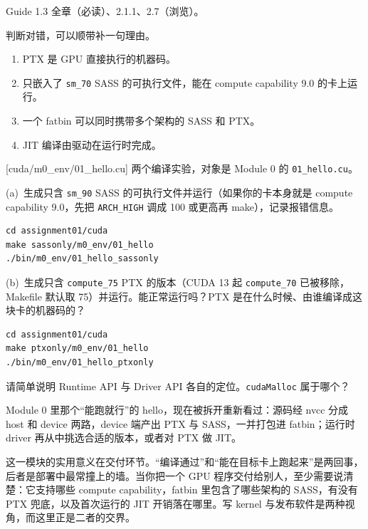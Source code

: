 \documentclass[11pt,a4paper,fontset=none]{ctexart}
\begin{document}
\begin{reading}
Guide 1.3 全章（必读）、2.1.1、2.7（浏览）。
\end{reading}

判断对错，可以顺带补一句理由。
\begin{enumerate}[label=(\alph*)]
  \item PTX 是 GPU 直接执行的机器码。
  \item 只嵌入了 \texttt{sm\_70} SASS 的可执行文件，能在 compute capability 9.0 的卡上运行。
  \item 一个 fatbin 可以同时携带多个架构的 SASS 和 PTX。
  \item JIT 编译由驱动在运行时完成。
\end{enumerate}

[cuda/m0\_env/01\_hello.cu]
两个编译实验，对象是 Module 0 的 \texttt{01\_hello.cu}。

(a)~生成只含 \texttt{sm\_90} SASS 的可执行文件并运行（如果你的卡本身就是 compute capability 9.0，先把 \texttt{ARCH\_HIGH} 调成 100 或更高再 make），记录报错信息。

\begin{lstlisting}
cd assignment01/cuda
make sassonly/m0_env/01_hello
./bin/m0_env/01_hello_sassonly
\end{lstlisting}

(b)~生成只含 \texttt{compute\_75} PTX 的版本（CUDA 13 起 \texttt{compute\_70} 已被移除，Makefile 默认取 75）并运行。能正常运行吗？PTX 是在什么时候、由谁编译成这块卡的机器码的？

\begin{lstlisting}
cd assignment01/cuda
make ptxonly/m0_env/01_hello
./bin/m0_env/01_hello_ptxonly
\end{lstlisting}

请简单说明 Runtime API 与 Driver API 各自的定位。\texttt{cudaMalloc} 属于哪个？

\begin{lookback}
Module 0 里那个“能跑就行”的 hello，现在被拆开重新看过：源码经 nvcc 分成 host 和 device 两路，device 端产出 PTX 与 SASS，一并打包进 fatbin；运行时 driver 再从中挑选合适的版本，或者对 PTX 做 JIT。

这一模块的实用意义在交付环节。“编译通过”和“能在目标卡上跑起来”是两回事，后者是部署中最常撞上的墙。当你把一个 GPU 程序交付给别人，至少需要说清楚：它支持哪些 compute capability，fatbin 里包含了哪些架构的 SASS，有没有 PTX 兜底，以及首次运行的 JIT 开销落在哪里。写 kernel 与发布软件是两种视角，而这里正是二者的交界。
\end{lookback}
\end{document}
